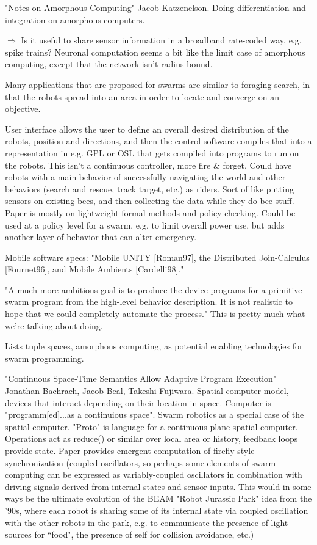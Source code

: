 \documentclass[]{article}
\begin{document}
"Notes on Amorphous Computing" Jacob Katzenelson. \cite{katzenelson2000notes} Doing differentiation and integration on amorphous computers. 

$\Rightarrow$ Is it useful to share sensor information in a broadband rate-coded way, e.g. spike trains? Neuronal computation seems a bit like the limit case of amorphous computing, except that the network isn't radius-bound. 

Many applications that are proposed for swarms are similar to foraging search, in that the robots spread into an area in order to locate and converge on an objective. 

User interface allows the user to define an overall desired distribution of the robots, position and directions, and then the control software compiles that into a representation in e.g. GPL or OSL that gets compiled into programs to run on the robots. This isn't a continuous controller, more fire \& forget. Could have robots with a main behavior of successfully navigating the world and other behaviors (search and rescue, track target, etc.) as riders. Sort of like putting sensors on existing bees, and then collecting the data while they do bee stuff. Paper is mostly on lightweight formal methods and policy checking. Could be used at a policy level for a swarm, e.g. to limit overall power use, but adds another layer of behavior that can alter emergency. 

Mobile software specs: "Mobile UNITY [Roman97], the Distributed Join-Calculus [Fournet96], and Mobile Ambients [Cardelli98]."

"A much more ambitious goal is to produce the device programs for a primitive swarm program from the high-level behavior description. It is not realistic to hope that we could completely automate the process." This is pretty much what we're talking about doing. 

Lists tuple spaces, amorphous computing, as potential enabling technologies for swarm programming. 

"Continuous Space-Time Semantics Allow Adaptive Program Execution" \cite{bachrach2007continuous} Jonathan Bachrach, Jacob Beal, Takeshi Fujiwara. Spatial computer model, devices that interact depending on their location in space. Computer is "programm[ed]...as a continuious space". Swarm robotics as a special case of the spatial computer. "Proto" is language for a continuous plane spatial computer. Operations act as reduce() or similar over local area or history, feedback loops provide state. Paper provides emergent computation of firefly-style synchronization (coupled oscillators, so perhaps some elements of swarm computing can be expressed as variably-coupled oscillators in combination with driving signals derived from internal states and sensor inputs. This would in some ways be the ultimate evolution of the BEAM "Robot Jurassic Park" idea from the '90s, where each robot is sharing some of its internal state via coupled oscillation with the other robots in the park, e.g. to communicate the presence of light sources for ``food", the presence of self for collision avoidance, etc.)
\end{document}
